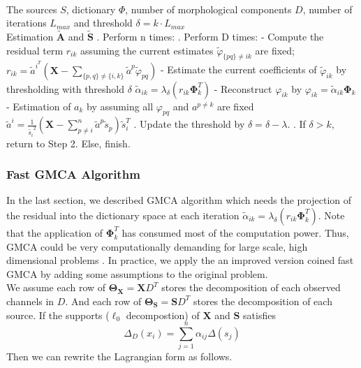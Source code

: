 \newpage
\begin{algorithm}[H] 
\label{algFramwork3} 
\begin{algorithmic}
\REQUIRE ~~\\%
The sources $S$, dictionary $\Phi$, number of morphological components $D$, number of iterations $L_{max}$ and threshold $\delta = k \cdot L_{max}$
\ENSURE ~~\\ %
Estimation $\tilde{\mathbf{A}}$ and $\tilde{\mathbf{S}}$
. Perform n times:
\STATE {}. Perform D times:
\STATE \qquad \quad - Compute the residual term $r_{ik}$ assuming the current estimates $\tilde{\varphi}_{\{pq\} \neq ik}$ are fixed; 
\STATE \qquad \quad $r_{ik} = \tilde{a}^i^T(\mathbf{X} - \sum_{\{p,q\} \neq \{i,k\}} \tilde{a}^p \tilde{\varphi}_{pq}) $
\STATE \qquad \quad - Estimate the current coefficients of $\tilde{\varphi}_{ik}$ by thresholding with threshold $\delta$
\STATE \qquad \quad $\tilde{\alpha}_{ik} = \lambda_{\delta}(r_{ik}\mathbf{\Phi}_k^T)$
\STATE \qquad \quad - Reconstruct $\varphi_{ik}$ by $\varphi_{ik} = \tilde{\alpha}_{ik} \mathbf{\Phi}_k$
\STATE \qquad \quad - Estimation of $a_k$ by assuming all $\varphi_{pq}$ and $a^{p \neq k}$ are fixed 
\STATE \qquad \quad $\tilde{a}^i = \frac{1}{\tilde{s_i}^2}(\mathbf{X} - \sum_{p\neq i}^n \tilde{a}^p\tilde{s}_p)\tilde{s}_i^T$
. Update the threshold by $\delta = \delta - \lambda$.
. If $\delta>k $, return to Step 2. Else, finish.
\end{algorithmic}
\end{algorithm}

\subsubsection{Fast GMCA Algorithm}
In the last section, we described GMCA algorithm which needs the projection of the residual into the dictionary space at each iteration $\tilde{\alpha}_{ik} = \lambda_{\delta}(r_{ik}\mathbf{\Phi}_k^T)$. Note that the application of $\mathbf{\Phi}_k^T$ has consumed most of the computation power. Thus, GMCA could be very computationally demanding for large scale, high dimensional problems \cite{BobinJ_2007SaMD}. In practice, we apply the an improved version coined fast GMCA by adding some assumptions to the original problem.\\

We assume each row of $\mathbf{\Theta_X}=\mathbf{X}D^T$ stores the decomposition of each observed channels in $D$. And each row of $\mathbf{\Theta_S}=\mathbf{S}D^T$ stores the decomposition of each source. 
If the supports ($\ell_0$ decompostion) of $\mathbf{X}$ and $\mathbf{S}$ satisfies 
\begin{equation}
    \Delta_D(x_i) = \sum_{j=1}^{n}\alpha_{ij}\Delta(s_j)
\end{equation}
Then we can rewrite the Lagrangian form \label{GMCAequation} as follows.

